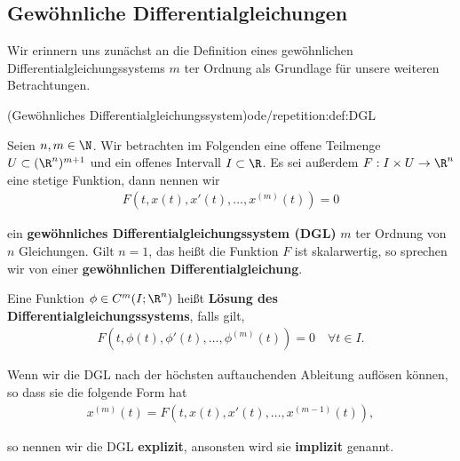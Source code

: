 \documentclass[letterpaper,10pt,german]{jupyterBook}
\begin{document}
\subsection{Gewöhnliche Differentialgleichungen}
\label{\detokenize{ode/repetition:gewohnliche-differentialgleichungen}}
\par
Wir erinnern uns zunächst an die Definition eines gewöhnlichen Differentialgleichungssystems \(m\) ter Ordnung als Grundlage für unsere weiteren Betrachtungen.
\begin{definition}{(Gewöhnliches Differentialgleichungssystem)}{ode/repetition:def:DGL}



\par
Seien \(n,m \in \N\).
Wir betrachten im Folgenden eine offene Teilmenge \(U\subset (\R^n)^{m+1}\) und ein offenes Intervall \(I\subset\R\).
Es sei außerdem \(F:I\times U\rightarrow\R^n\) eine stetige Funktion, dann nennen wir
\begin{align}\label{equation:ode/repetition:eq:DGL}
F(t,x(t),x'(t),\ldots,x^{(m)}(t)) = 0
\end{align}
\par
ein \textbf{gewöhnliches Differentialgleichungssystem (DGL)} \(m\) ter Ordnung von \(n\) Gleichungen.
Gilt \(n=1\), das heißt die Funktion \(F\) ist skalarwertig, so sprechen wir von einer \textbf{gewöhnlichen Differentialgleichung}.

\par
Eine Funktion \(\phi\in C^m(I;\R^n)\) heißt \textbf{Lösung des Differentialgleichungssystems}, falls gilt,
\begin{align*}
F(t, \phi(t), \phi'(t), \ldots, \phi^{(m)}(t)) = 0 \quad \forall t\in I.
\end{align*}
\par
Wenn wir die DGL nach der höchsten auftauchenden Ableitung auflösen können, so dass sie die folgende Form hat
\begin{align*}
x^{(m)}(t) = F(t,x(t),x'(t),\ldots,x^{(m-1)}(t)),
\end{align*}
\par
so nennen wir die DGL \textbf{explizit}, ansonsten wird sie \textbf{implizit} genannt.
\end{definition}
\end{document}
